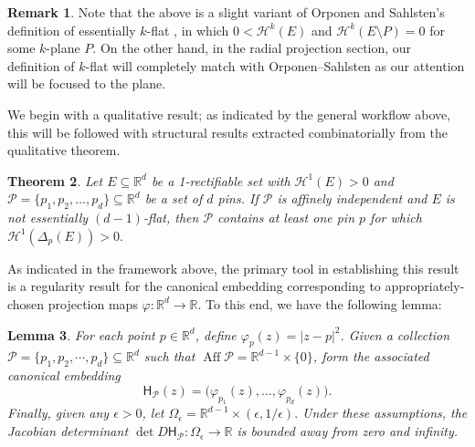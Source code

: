 \documentclass[12pt]{amsart}
\newtheorem{theorem}{Theorem}[section]
\newtheorem{lemma}[theorem]{Lemma}
\theoremstyle{definition}
\newtheorem{remark}[theorem]{Remark}
\numberwithin{equation}{section}
\DeclareMathOperator{\Aff}{Aff}
\begin{document}
\begin{remark}
Note that the above is a slight variant of Orponen and Sahlsten's definition of essentially $k$-flat \cite{OS2011}, in which $0< \mathcal H^k(E)$ and $\mathcal H^k(E\setminus P) = 0$ for some $k$-plane $P$. On the other hand, in the radial projection section, our definition of $k$-flat will completely match with Orponen--Sahlsten as our attention will be focused to the plane.
\end{remark}

We begin with a qualitative result; as indicated by the general workflow above, this will be followed with structural results extracted combinatorially from the qualitative theorem.
\begin{theorem}\label{thm:main_pinned_result}
Let $E \subseteq \mathbb{R}^d$ be a 1-rectifiable set with $\mathcal{H}^1(E) > 0$ and $\mathcal{P} = \{p_1, p_2, \dots, p_d\} \subseteq \mathbb{R}^d$ be a set of $d$ pins. If $\mathcal{P}$ is affinely independent and $E$ is not essentially $(d-1)$-flat, then $\mathcal{P}$ contains 
at least one pin $p$ for which $\mathcal{H}^1(\Delta_p(E))>0.$
\end{theorem}
As indicated in the framework above, the primary tool in establishing this result is a regularity result for the canonical embedding corresponding to appropriately-chosen projection maps $\varphi : \mathbb{R}^d \to \mathbb{R}$. To this end, we have the following lemma:
\begin{lemma}\label{lemma:pinned_distance_canonical_embedding} For each point $p \in \mathbb{R}^d$, define $\varphi_p(z) = |z - p|^2$. Given a collection $\mathcal{P} = \{p_1, p_2, \cdots, p_d\} \subseteq \mathbb{R}^d$ such that $\Aff \mathcal{P}  = \mathbb{R}^{d - 1} \times \{0\}$, form the associated canonical embedding
$$\mathsf{H}_{\mathcal{P}}(z) = \big(\varphi_{p_1}(z), \dots, \varphi_{p_d}(z)\big).$$
Finally, given any $\epsilon > 0$, let $\Omega_{\epsilon} = \mathbb{R}^{d - 1} \times (\epsilon, 1/\epsilon).$ Under these assumptions, the Jacobian determinant $\det D\mathsf{H}_{\mathcal{P}} : \Omega_{\epsilon} \to \mathbb{R}$ is bounded away from zero and infinity.
\end{lemma}
\end{document}

